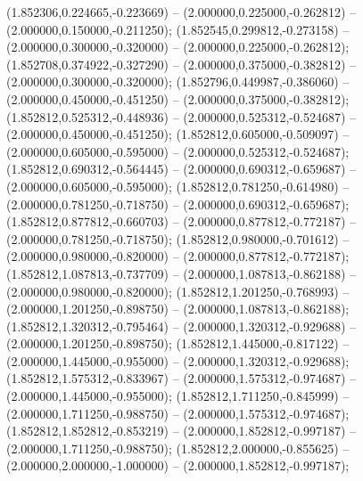  (1.852306,0.224665,-0.223669) -- (2.000000,0.225000,-0.262812) -- (2.000000,0.150000,-0.211250);
 (1.852545,0.299812,-0.273158) -- (2.000000,0.300000,-0.320000) -- (2.000000,0.225000,-0.262812);
 (1.852708,0.374922,-0.327290) -- (2.000000,0.375000,-0.382812) -- (2.000000,0.300000,-0.320000);
 (1.852796,0.449987,-0.386060) -- (2.000000,0.450000,-0.451250) -- (2.000000,0.375000,-0.382812);
 (1.852812,0.525312,-0.448936) -- (2.000000,0.525312,-0.524687) -- (2.000000,0.450000,-0.451250);
 (1.852812,0.605000,-0.509097) -- (2.000000,0.605000,-0.595000) -- (2.000000,0.525312,-0.524687);
 (1.852812,0.690312,-0.564445) -- (2.000000,0.690312,-0.659687) -- (2.000000,0.605000,-0.595000);
 (1.852812,0.781250,-0.614980) -- (2.000000,0.781250,-0.718750) -- (2.000000,0.690312,-0.659687);
 (1.852812,0.877812,-0.660703) -- (2.000000,0.877812,-0.772187) -- (2.000000,0.781250,-0.718750);
 (1.852812,0.980000,-0.701612) -- (2.000000,0.980000,-0.820000) -- (2.000000,0.877812,-0.772187);
 (1.852812,1.087813,-0.737709) -- (2.000000,1.087813,-0.862188) -- (2.000000,0.980000,-0.820000);
 (1.852812,1.201250,-0.768993) -- (2.000000,1.201250,-0.898750) -- (2.000000,1.087813,-0.862188);
 (1.852812,1.320312,-0.795464) -- (2.000000,1.320312,-0.929688) -- (2.000000,1.201250,-0.898750);
 (1.852812,1.445000,-0.817122) -- (2.000000,1.445000,-0.955000) -- (2.000000,1.320312,-0.929688);
 (1.852812,1.575312,-0.833967) -- (2.000000,1.575312,-0.974687) -- (2.000000,1.445000,-0.955000);
 (1.852812,1.711250,-0.845999) -- (2.000000,1.711250,-0.988750) -- (2.000000,1.575312,-0.974687);
 (1.852812,1.852812,-0.853219) -- (2.000000,1.852812,-0.997187) -- (2.000000,1.711250,-0.988750);
 (1.852812,2.000000,-0.855625) -- (2.000000,2.000000,-1.000000) -- (2.000000,1.852812,-0.997187);
